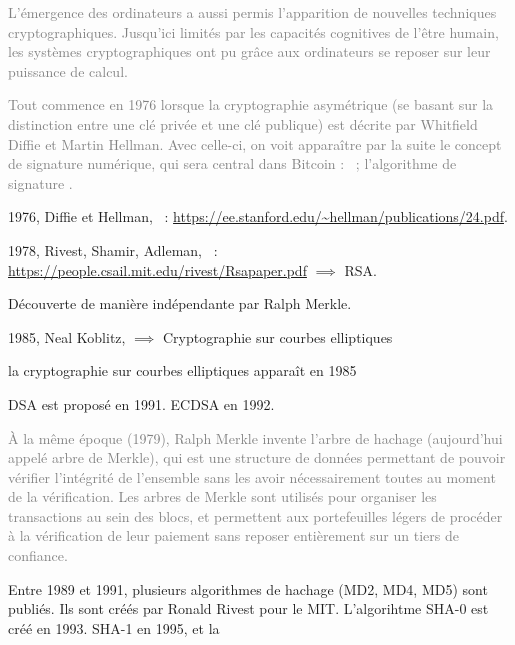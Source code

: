 \textcolor{gray}{L'émergence des ordinateurs a aussi permis l'apparition de nouvelles techniques cryptographiques. Jusqu'ici limités par les capacités cognitives de l'être humain, les systèmes cryptographiques ont pu grâce aux ordinateurs se reposer sur leur puissance de calcul.}

\textcolor{gray}{Tout commence en 1976 lorsque la cryptographie asymétrique (se basant sur la distinction entre une clé privée et une clé publique) est décrite par Whitfield Diffie et Martin Hellman. Avec celle-ci, on voit apparaître par la suite le concept de signature numérique, qui sera central dans Bitcoin : ~; l'algorithme de signature .}

1976, Diffie et Hellman, ~: \url{https://ee.stanford.edu/~hellman/publications/24.pdf}.

1978, Rivest, Shamir, Adleman, ~: \url{https://people.csail.mit.edu/rivest/Rsapaper.pdf} $\implies$ RSA.

Découverte de manière indépendante par Ralph Merkle.

1985, Neal Koblitz,  $\implies$ Cryptographie sur courbes elliptiques


la cryptographie sur courbes elliptiques apparaît en 1985

DSA est proposé en 1991. ECDSA en 1992.


\textcolor{gray}{À la même époque (1979), Ralph Merkle invente l'arbre de hachage (aujourd'hui appelé arbre de Merkle), qui est une structure de données permettant de pouvoir vérifier l'intégrité de l'ensemble sans les avoir nécessairement toutes au moment de la vérification. Les arbres de Merkle sont utilisés pour organiser les transactions au sein des blocs, et permettent aux portefeuilles légers de procéder à la vérification de leur paiement sans reposer entièrement sur un tiers de confiance.}


Entre 1989 et 1991, plusieurs algorithmes de hachage (MD2, MD4, MD5) sont publiés. Ils sont créés par Ronald Rivest pour le MIT. L'algorihtme SHA-0 est créé en 1993. SHA-1 en 1995, et la

